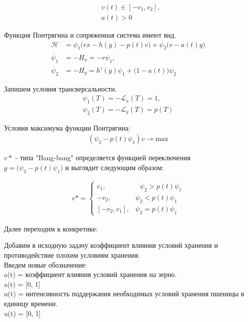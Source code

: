 \begin{align}
    & v(t) \in [-v_{1}, v_{2}], \\
    & a(t) > 0
\end{align}

Функция Понтрягина и сопряженная система имеют вид. 
\begin{align}
    \mathcal{H} & = \psi_{1} \big( r x- h(y) - p(t) v \big) + \psi_{2} \big( v - a(t)y \big)\\
    \Dot{\psi_{1}} & = -H_x = -r \psi_{1},\\
    \Dot{\psi_{2}} & = -H_y = h'(y) \psi_{1} + \big(1- a(t)\big)\psi_{2}
\end{align} 

Запишем  условия трансверсальности.
\begin{align}
    {\psi_{1}(T)} = \mathcal{- L}_x(T)= 1,\\
    {\psi_{2}(T)} = \mathcal {- L}_y(T)= p(T)
\end{align} 


Условия максимума функции Понтрягина:\\
\begin{align}
     (\psi_{2} - p(t)\psi_{1})v \to \mathrm{max}
\end{align}


${v*}$ - типа "Bang-bang" определяется функцией переключения\\
$g = \big (\psi_{2} - p(t)\psi_{1} \big)$ и выглядит следующим образом:

\begin{align}
v* = 
 \begin{cases}
   v_{1}, &\text{ $\psi_{2} > p(t)\psi_{1}$}\\
   -v_{2}, &\text{$\psi_{2} < p(t)\psi_{1}$}\\
   [-v_{2},v_{1}], &\text{$\psi_{2} = p(t)\psi_{1}$}
 \end{cases}
\end{align}

Далее переходим к конкретике: 

Добавим в исходную задачу коэффициент влияния условий хранения и противодействие плохим условиям хранения.\\

Введем новые обозначение:\\
{a(t)} = коэффициент влияния условий хранения на зерно.\\
a(t) = [0, 1]\\
{u(t)} = интенсивность поддержания необходимых условий хранения пшеницы в единицу времени.\\
u(t) = [0, 1]\\

